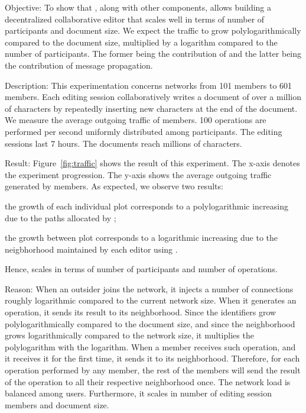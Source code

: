 \begin{asparadesc}
\item [Objective:] To show that \LSEQ, along with other components, allows
  building a decentralized collaborative editor that scales well in terms of
  number of participants and document size. We expect the traffic to grow
  polylogarithmically compared to the document size, multiplied by a logarithm
  compared to the number of participants. The former being the contribution of
  \LSEQ and the latter being the contribution of message propagation.
\item [Description:] This experimentation concerns networks from 101 members to
  601 members. Each editing session collaboratively writes a document of over a
  million of characters by repeatedly inserting new characters at the end of the
  document. We measure the average outgoing traffic of members. 100 operations
  are performed per second uniformly distributed among participants. The
  editing sessions last 7 hours. The documents reach millions of characters.
\item [Result:] Figure~\ref{fig:traffic} shows the result of this experiment.
  The x-axis denotes the experiment progression. The y-axis shows the average
  outgoing traffic generated by members. As expected, we observe two results:
  \begin{inparaenum}[(i)]
  \item the growth of each individual plot corresponds to a polylogarithmic
    increasing due to the paths allocated by \LSEQ;
  \item the growth between plot corresponds to a logarithmic increasing due to
    the neigbhorhood maintained by each editor using \SPRAY.
  \end{inparaenum}
  Hence, \CRATE scales in terms of number of participants and number of
  operations.
\item [Reason:] When an outsider joins the network, it injects a number of
  connections roughly logarithmic compared to the current network size. When it
  generates an operation, it sends its result to its neighborhood. Since the
  identifiers grow polylogarithmically compared to the document size, and since
  the neighborhood grows logarithmically compared to the network size, it
  multiplies the polylogarithm with the logarithm. When a member receives such
  operation, and it receives it for the first time, it sends it to its
  neighborhood. Therefore, for each operation performed by any member, the rest
  of the members will send the result of the operation to all their respective
  neighborhood once. The network load is balanced among users. Furthermore, it
  scales in number of editing session members and document size.
\end{asparadesc}

